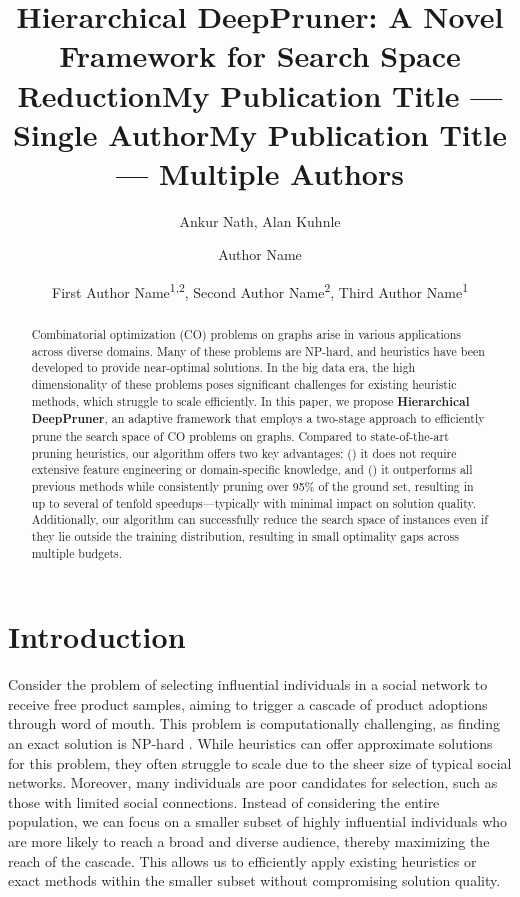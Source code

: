 \documentclass[letterpaper]{article} %
\title{Hierarchical DeepPruner: A Novel Framework for Search Space Reduction}
\author{
    Ankur Nath, Alan Kuhnle
}
\title{My Publication Title --- Single Author}
\author {
    Author Name
}
\title{My Publication Title --- Multiple Authors}
\author {
    First Author Name\textsuperscript{\rm 1,\rm 2},
    Second Author Name\textsuperscript{\rm 2},
    Third Author Name\textsuperscript{\rm 1}
}
\begin{document}
\maketitle

\begin{abstract}
Combinatorial optimization (CO) problems on graphs arise in various applications across diverse domains. Many of these problems are NP-hard, and heuristics have been developed to provide near-optimal solutions. In the big data era, the high dimensionality of these problems poses significant challenges for existing heuristic methods, which struggle to scale efficiently. In this paper, we propose \textbf{Hierarchical DeepPruner}, an adaptive framework that employs a two-stage approach to efficiently prune the search space of CO problems on graphs. Compared to state-of-the-art pruning heuristics, our algorithm offers two key advantages: () it does not require extensive feature engineering or domain-specific knowledge, and () it outperforms all previous methods while consistently pruning over 95\% of the ground set, resulting in up to several of tenfold speedups—typically with minimal impact on solution quality. Additionally, our algorithm can successfully reduce the search space of instances even if they lie outside the training distribution, resulting in small optimality gaps across multiple budgets. 
\end{abstract}

%


\section{Introduction}

Consider the problem of selecting influential individuals in a social network to receive free product samples, aiming to trigger a cascade of product adoptions through word of mouth. This problem is computationally challenging, as finding an exact solution is NP-hard \cite{kempe2003maximizing}. While heuristics can offer approximate solutions for this problem, they often struggle to scale due to the sheer size of typical social networks. Moreover, many individuals are poor candidates for selection, such as those with limited social connections. Instead of considering the entire population, we can focus on a smaller subset of highly influential individuals who are more likely to reach a broad and diverse audience, thereby maximizing the reach of the cascade. This allows us to efficiently apply existing heuristics or exact methods within the smaller subset without compromising solution quality.
\end{document}
